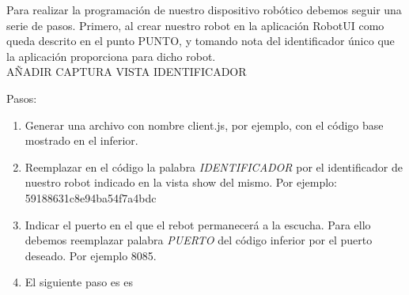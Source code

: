 Para realizar la programación de nuestro dispositivo robótico debemos seguir una serie de pasos. Primero, al crear nuestro robot en la aplicación RobotUI como queda descrito en el punto PUNTO, y tomando nota
del identificador único que la aplicación proporciona para dicho robot.\\	


AÑADIR CAPTURA VISTA IDENTIFICADOR


Pasos:

\begin{enumerate}
  \item Generar una archivo con nombre client.js, por ejemplo, con el código base mostrado en el inferior.
  \item Reemplazar en el código la palabra \emph{IDENTIFICADOR} por el identificador de nuestro robot indicado en la vista show del mismo. Por ejemplo: 59188631c8e94ba54f7a4bdc
  \item Indicar el puerto en el que el rebot permanecerá a la escucha. Para ello debemos reemplazar palabra \emph{PUERTO} del código inferior por el puerto deseado. Por ejemplo 8085. 
  
  \item El siguiente paso es es
  
\end{enumerate}




